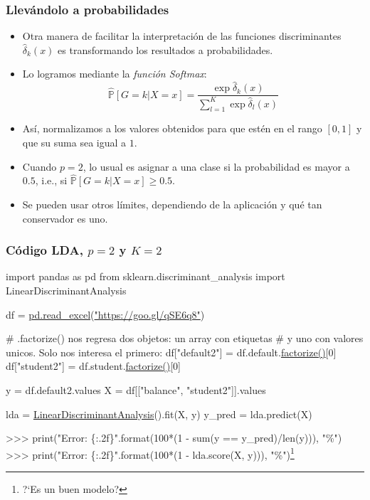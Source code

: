 \documentclass[usenames,dvipsnames]{beamer} %
\newcommand\defi[1]{\textcolor{NavyBlue}{\textit{#1}}}
\begin{document}
\begin{frame}\frametitle{Llev\'andolo a probabilidades}
\begin{itemize}
	\item Otra manera de facilitar la interpretaci\'on de las funciones discriminantes $\hat \delta_k (x)$ es transformando los resultados a probabilidades.
	\item Lo logramos mediante la \defi{funci\'on Softmax}:
	\begin{equation}\label{eq:softmax}
	\hat{\mathbb{P}}[G=k|X=x]=\frac{\exp{\hat \delta_k(x)}}{\sum_{l=1}^{K}\exp{\hat \delta_l(x)}}
	\end{equation}
	\item As\'i, normalizamos a los valores obtenidos para que est\'en en el rango $[0,1]$ y que su suma sea igual a $1$.
	\item Cuando $p=2$, lo usual es asignar a una clase si la probabilidad es mayor a $0.5$, i.e., si $\hat{\mathbb{P}}[G=k|X=x]\geq 0.5$.
	\item Se pueden usar otros l\'imites, dependiendo de la aplicaci\'on y qu\'e tan conservador es uno.
\end{itemize}
\end{frame}


\begin{frame}[fragile]\frametitle{C\'odigo LDA, $p=2$ y $K=2$}
\begin{semiverbatim}
	\footnotesize{\textcolor{deepblue}{import} pandas \textcolor{deepblue}{as} pd
		\textcolor{deepblue}{from} sklearn.discriminant\_analysis \textcolor{deepblue}{import} LinearDiscriminantAnalysis
		
		df = \href{https://pandas.pydata.org/pandas-docs/stable/reference/api/pandas.read_excel.html}{pd.read\_excel}(\href{https://goo.gl/qSE6q8}{"https://goo.gl/qSE6q8"})
		
		# .factorize() nos regresa dos objetos: un array con etiquetas
		# y uno con valores unicos. Solo nos interesa el primero:
		df["default2"] = df.default.\href{https://pandas.pydata.org/pandas-docs/version/0.23.4/generated/pandas.factorize.html}{factorize()}[0]
		df["student2"] = df.student.\href{https://pandas.pydata.org/pandas-docs/version/0.23.4/generated/pandas.factorize.html}{factorize()}[0]
		
		y = df.default2.values
		X = df[["balance", "student2"]].values
		
		lda = \href{https://scikit-learn.org/stable/modules/generated/sklearn.discriminant_analysis.LinearDiscriminantAnalysis.html#sklearn.discriminant_analysis.LinearDiscriminantAnalysis}{LinearDiscriminantAnalysis}().fit(X, y)
		y\_pred = lda.predict(X)
		
		>>> print("Error: \{:.2f\}".format(100*(1 - sum(y == y\_pred)/len(y))), "\%")
		>>> print("Error: \{:.2f\}".format(100*(1 - lda.score(X, y))), "\%")\footnote{?`Es un buen modelo?}
	}
\end{semiverbatim}
\end{frame}
\end{document}
